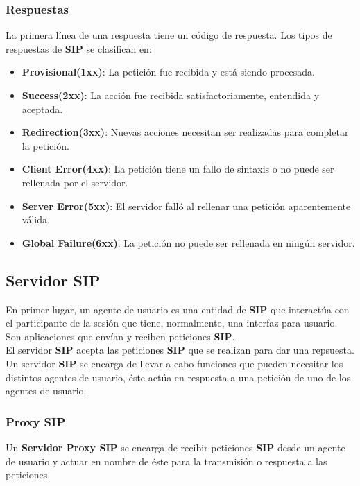 \documentclass[a4paper, 11pt]{article} %
\begin{document}
		\subsubsection{Respuestas}
		La primera línea de una respuesta tiene un código de respuesta. Los tipos de respuestas de \textbf{SIP} se clasifican en:
		\begin{itemize}
			\item \textbf{Provisional(1xx)}: La petición fue recibida y está siendo  procesada.
			\item \textbf{Success(2xx)}: La acción fue recibida satisfactoriamente, entendida y aceptada.
			\item \textbf{Redirection(3xx)}: Nuevas acciones necesitan ser realizadas para completar la petición.
			\item \textbf{Client Error(4xx)}: La petición tiene un fallo de sintaxis o no puede ser rellenada por el servidor.
			\item \textbf{Server Error(5xx)}: El servidor falló al rellenar una petición aparentemente válida.
			\item \textbf{Global Failure(6xx)}: La petición no puede ser rellenada en ningún servidor.
		\end{itemize}
	
	\subsection{Servidor SIP}
		En primer lugar, un agente de usuario es una entidad de \textbf{SIP} que interactúa con el participante de la sesión que tiene, normalmente, una interfaz para usuario. Son aplicaciones que envían y reciben peticiones \textbf{SIP}.\\
		El servidor \textbf{SIP} acepta las peticiones \textbf{SIP} que se realizan para dar una repsuesta. Un servidor \textbf{SIP} se encarga de llevar a cabo funciones que pueden necesitar los distintos agentes de usuario, éste actúa en respuesta a una petición de uno de los agentes de usuario.
		
		\subsubsection{Proxy SIP}
			Un \textbf{Servidor Proxy SIP} se encarga de recibir peticiones \textbf{SIP} desde un agente de usuario y actuar en nombre de éste para la transmisión o respuesta a las peticiones.
		
\end{document}
